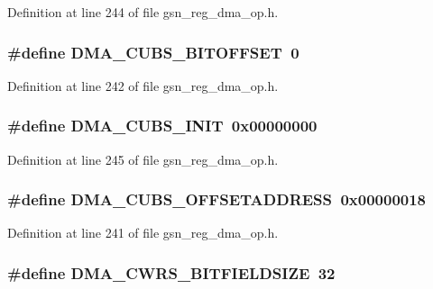 Definition at line 244 of file gsn\_\-reg\_\-dma\_\-op.h.

\hypertarget{a00547_a03295c1564a9a1804f4a2d7186a4a0f0}{
\subsubsection[{DMA\_\-CUBS\_\-BITOFFSET}]{\setlength{\rightskip}{0pt plus 5cm}\#define DMA\_\-CUBS\_\-BITOFFSET~0}}
\label{a00547_a03295c1564a9a1804f4a2d7186a4a0f0}


Definition at line 242 of file gsn\_\-reg\_\-dma\_\-op.h.

\hypertarget{a00547_a949b53f83e9d5dc492fdc1b7a08c8bf9}{
\subsubsection[{DMA\_\-CUBS\_\-INIT}]{\setlength{\rightskip}{0pt plus 5cm}\#define DMA\_\-CUBS\_\-INIT~0x00000000}}
\label{a00547_a949b53f83e9d5dc492fdc1b7a08c8bf9}


Definition at line 245 of file gsn\_\-reg\_\-dma\_\-op.h.

\hypertarget{a00547_ae42ec34ee47aeb93de341a6ef4087d21}{
\subsubsection[{DMA\_\-CUBS\_\-OFFSETADDRESS}]{\setlength{\rightskip}{0pt plus 5cm}\#define DMA\_\-CUBS\_\-OFFSETADDRESS~0x00000018}}
\label{a00547_ae42ec34ee47aeb93de341a6ef4087d21}


Definition at line 241 of file gsn\_\-reg\_\-dma\_\-op.h.

\hypertarget{a00547_ac981427fe25c5e12ec664b71a9b852ae}{
\subsubsection[{DMA\_\-CWRS\_\-BITFIELDSIZE}]{\setlength{\rightskip}{0pt plus 5cm}\#define DMA\_\-CWRS\_\-BITFIELDSIZE~32}}
\label{a00547_ac981427fe25c5e12ec664b71a9b852ae}


